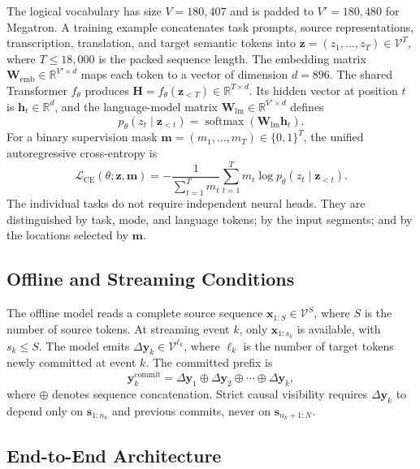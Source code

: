 \documentclass[11pt,a4paper]{article}
\newcommand{\vect}[1]{\bm{#1}}
\newcommand{\mat}[1]{\bm{#1}}
\newcommand{\R}{\mathbb{R}}
\newcommand{\Vocab}{\mathcal{V}}
\newcommand{\Loss}{\mathcal{L}}
\begin{document}
The logical vocabulary has size $V=180{,}407$ and is padded to $V'=180{,}480$ for Megatron. A training example concatenates task prompts, source representations, transcription, translation, and target semantic tokens into $\vect{z}=(z_1,\ldots,z_T)\in\Vocab^T$, where $T\leq18{,}000$ is the packed sequence length. The embedding matrix $\mat{W}_{\mathrm{emb}}\in\R^{V'\times d}$ maps each token to a vector of dimension $d=896$. The shared Transformer $f_\theta$ produces $\mat{H}=f_\theta(\vect{z}_{<T})\in\R^{T\times d}$. Its hidden vector at position $t$ is $\vect{h}_t\in\R^d$, and the language-model matrix $\mat{W}_{\mathrm{lm}}\in\R^{V'\times d}$ defines
\begin{equation}
  p_\theta(z_t\mid\vect{z}_{<t})
  =\operatorname{softmax}\!\left(\mat{W}_{\mathrm{lm}}\vect{h}_t\right).
  \label{eq:ar}
\end{equation}
For a binary supervision mask $\vect{m}=(m_1,\ldots,m_T)\in\{0,1\}^{T}$, the unified autoregressive cross-entropy is
\begin{equation}
  \Loss_{\mathrm{CE}}(\theta;\vect{z},\vect{m})
  =-\frac{1}{\sum_{t=1}^{T}m_t}
  \sum_{t=1}^{T}m_t\log p_\theta(z_t\mid\vect{z}_{<t}).
  \label{eq:ce}
\end{equation}
The individual tasks do not require independent neural heads. They are distinguished by task, mode, and language tokens; by the input segments; and by the locations selected by $\vect{m}$.

\subsection{Offline and Streaming Conditions}

The offline model reads a complete source sequence $\vect{x}_{1:S}\in\Vocab^S$, where $S$ is the number of source tokens. At streaming event $k$, only $\vect{x}_{1:s_k}$ is available, with $s_k\leq S$. The model emits $\Delta\vect{y}_k\in\Vocab^{\ell_k}$, where $\ell_k$ is the number of target tokens newly committed at event $k$. The committed prefix is
\begin{equation}
  \vect{y}^{\mathrm{commit}}_k
  =\Delta\vect{y}_1\oplus\Delta\vect{y}_2\oplus\cdots\oplus\Delta\vect{y}_k,
  \label{eq:commit}
\end{equation}
where $\oplus$ denotes sequence concatenation. Strict causal visibility requires $\Delta\vect{y}_k$ to depend only on $\vect{s}_{1:n_k}$ and previous commits, never on $\vect{s}_{n_k+1:N}$.

\subsection{End-to-End Architecture}
\end{document}

